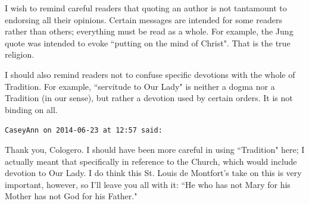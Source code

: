 \begin{footnotesize}
\begin{sffamily}
I wish to remind careful readers that quoting an author is not tantamount to endorsing all their opinions. Certain messages are intended for some readers rather than others; everything must be read as a whole. For example, the Jung quote was intended to evoke ``putting on the mind of Christ". That is the true religion.

I should also remind readers not to confuse specific devotions with the whole of Tradition. For example, ``servitude to Our Lady" is neither a dogma nor a Tradition (in our sense), but rather a devotion used by certain orders. It is not binding on all.


\hfill

\texttt{CaseyAnn on 2014-06-23 at 12:57 said: }

Thank you, Cologero. I should have been more careful in using ``Tradition" here; I actually meant that specifically in reference to the Church, which would include devotion to Our Lady. I do think this St. Louis de Montfort's take on this is very important, however, so I'll leave you all with it: ``He who has not Mary for his Mother has not God for his Father."


\end{sffamily}\end{footnotesize}
